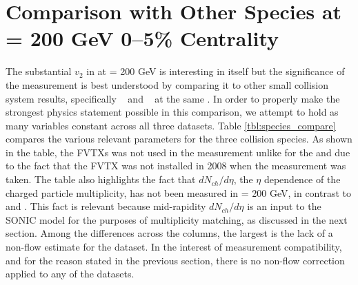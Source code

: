 \section{Comparison with Other Species at \sqsn =  200 GeV 0--5\% Centrality}
The substantial $v_2$ in \pau  at \sqsn =  200 GeV is interesting in itself but the significance of the measurement is best understood by comparing it to other small collision system results, specifically \hau~\cite{PhysRevLett.115.142301} and \dau~\cite{PhysRevLett.115.142301} at the same \sqsn. In order to properly make the strongest physics statement possible in this comparison, we attempt to hold as many variables constant across all three datasets. Table \ref{tbl:species_compare} compares the various relevant parameters for the three collision species. As shown in the table, the FVTXs was not used in the \dau measurement unlike for the \pau and \hau due to the fact that the FVTX was not installed in 2008 when the \dau measurement was taken. The table also highlights the fact that $dN_{ch}/d\eta$, the $\eta$ dependence of the charged particle multiplicity, has not been measured in \pau \sqsn = 200 GeV, in contrast to \hau and \dau. This fact is relevant because mid-rapidity $dN_{ch}/d\eta$ is an input to the SONIC model for the purposes of multiplicity matching, as discussed in the next section. Among the differences across the columns, the largest is the lack of a non-flow estimate for the \dau dataset. In the interest of measurement compatibility, and for the reason stated in the previous section, there is no non-flow correction applied to any of the datasets.

